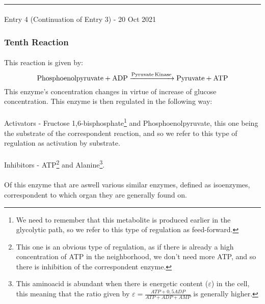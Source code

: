 \documentclass[12pt,  letterpaper]{article}
\begin{document}
\paragraph*{}
\hrule
\paragraph*{}
Entry 4 (Continuation of Entry 3) - 20 Oct 2021
\paragraph*{}
\subsubsection*{Tenth Reaction}
\paragraph*{}
This reaction is given by:
\begin{equation}
\ce{Phosphoenolpyruvate + ADP ->[Pyruvate Kinase] Pyruvate + ATP}
\end{equation}
This enzyme's concentration changes in virtue of increase of glucose concentration. This enzyme is then regulated in the following way:
\paragraph*{}
Activators - Fructose 1,6-bisphosphate\footnote{We need to remember that this metabolite is produced earlier in the glycolytic path, so we refer to this type of regulation as feed-forward.} and Phosphoenolpyruvate, this one being the substrate of the correspondent reaction, and so we refer to this type of regulation as activation by substrate.
\paragraph*{}
Inhibitors - ATP\footnote{This one is an obvious type of regulation, as if there is already a high concentration of ATP in the neighborhood, we don't need more ATP, and so there is inhibition of the correspondent enzyme.} and Alanine\footnote{This aminoacid is abundant when there is energetic content ($\varepsilon$) in the cell, this meaning that the ratio given by $\varepsilon = \frac{ATP + 0,5ADP}{ATP + ADP + AMP}$ is generally higher.}.
\paragraph*{}
Of this enzyme that are aswell various similar enzymes, defined as isoenzymes, correspondent to which organ they are generally found on.
\end{document}
